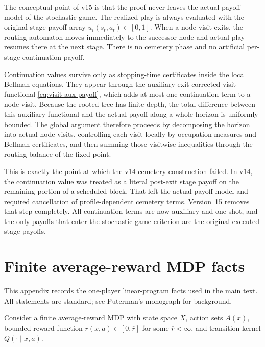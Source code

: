 \documentclass[12pt]{article}
\theoremstyle{definition}
\newcommand{\1}{\mathbf{1}}
\begin{document}
The conceptual point of v15 is that the proof never leaves the actual payoff
model of the stochastic game. The realized play is always evaluated with the
original stage payoff array $u_i(s_t,a_t)\in[0,1]$. When a node visit exits, the
routing automaton moves immediately to the successor node and actual play resumes
there at the next stage. There is no cemetery phase and no artificial per-stage
continuation payoff.

Continuation values survive only as stopping-time certificates inside the local
Bellman equations. They appear through the auxiliary exit-corrected visit
functional \eqref{eq:visit-aux-payoff}, which adds at most one continuation term
to a node visit. Because the rooted tree has finite depth, the total difference
between this auxiliary functional and the actual payoff along a whole horizon is
uniformly bounded. The global argument therefore proceeds by decomposing the
horizon into actual node visits, controlling each visit locally by occupation
measures and Bellman certificates, and then summing those visitwise inequalities
through the routing balance of the fixed point.

This is exactly the point at which the v14 cemetery construction failed. In v14,
the continuation value was treated as a literal post-exit stage payoff on the
remaining portion of a scheduled block. That left the actual payoff model and
required cancellation of profile-dependent cemetery terms. Version~15 removes
that step completely. All continuation terms are now auxiliary and one-shot, and
the only payoffs that enter the stochastic-game criterion are the original
executed stage payoffs.
\appendix


\section{Finite average-reward MDP facts}
\label{app:mdp}

This appendix records the one-player linear-program facts used in the main text.
All statements are standard; see Puterman's monograph \cite{Puterman1994} for
background.

Consider a finite average-reward MDP with state space $X$, action sets $A(x)$,
bounded reward function $r(x,a)\in[0,\overline r]$ for some $\overline r<\infty$,
and transition kernel $Q(\cdot\mid x,a)$.
\end{document}
